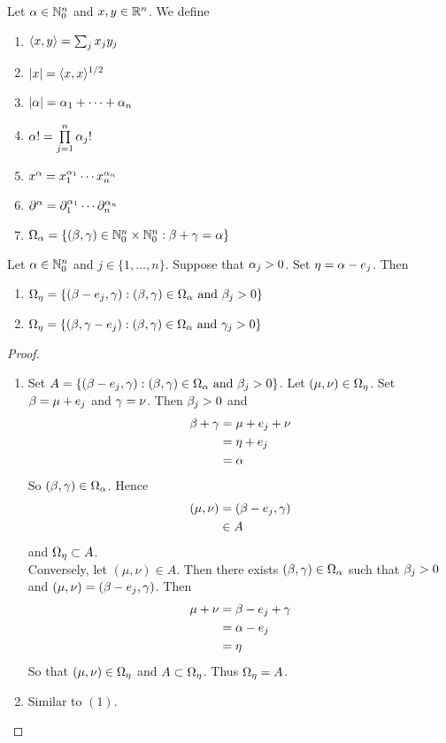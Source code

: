 \documentclass{book}
\begin{document}
	\begin{defn} 
		 Let $\alpha \in \mathbb{N}_0^n$ and $x, y \in \mathbb{R}^n$. We define 
		\begin{enumerate}
			\item $\langle x , y\rangle  = \sum_{j}x_jy_j$
			\item $|x| = \langle x, x\rangle^{1/2}$
			\item $|\alpha| = \alpha_1 + \cdots + \alpha_n$
			\item $\alpha! = \prod\limits_{j=1}^n \alpha_j!$
			\item $x^\alpha = x_1^{\alpha_1}\cdots x_n^{\alpha_n}$
			\item $\partial^{\alpha} = \partial_1^{\alpha_1} \cdots \partial_n^{\alpha_n}$
			\item $\Omega_{\alpha} = \{(\beta, \gamma) \in \mathbb{N}_0^n \times \mathbb{N}_0^n: \beta + \gamma = \alpha\}$
		\end{enumerate}
	\end{defn}

	\begin{ex} 
		Let $\alpha \in \mathbb{N}_0^n$ and $j \in \{1, \ldots, n\}$. Suppose that $\alpha_j > 0$. Set $\eta = \alpha - e_j$. Then 
		\begin{enumerate}
			\item $\Omega_{\eta} = \{(\beta - e_j, \gamma): (\beta, \gamma) \in \Omega_{\alpha} \text{ and } \beta_j > 0\}$
			\item $\Omega_{\eta} = \{(\beta, \gamma - e_j): (\beta, \gamma) \in \Omega_{\alpha} \text{ and } \gamma_j > 0\}$
		\end{enumerate}
	\end{ex}

	\begin{proof}\
		\begin{enumerate}
			\item Set $A = \{(\beta - e_j, \gamma): (\beta, \gamma) \in \Omega_{\alpha} \text{ and } \beta_j > 0\}$. Let $(\mu, \nu) \in \Omega_{\eta}$. Set $\beta = \mu + e_j$ and $\gamma = \nu$. Then $\beta_j > 0$ and 
			\begin{align*}
				\beta + \gamma 
				& = \mu + e_j + \nu \\
				& = \eta + e_j \\
				& = \alpha 
			\end{align*}
			So $(\beta, \gamma) \in \Omega_{\alpha}$. Hence
			\begin{align*}
				(\mu, \nu) 
				& = (\beta - e_j, \gamma) \\
				& \in A
			\end{align*}
			and $\Omega_{\eta} \subset A$. \\
			Conversely, let $(\mu, \nu) \in A$. Then there exists $(\beta, \gamma) \in \Omega_{\alpha}$ such that $\beta_j > 0$ and $(\mu, \nu) = (\beta - e_j, \gamma)$. Then 
			\begin{align*}
				\mu + \nu
				&= \beta - e_j + \gamma \\
				& = \alpha - e_j \\
				& = \eta 
			\end{align*}
			So that $(\mu, \nu) \in \Omega_{\eta}$ and $A \subset \Omega_{\eta}$. Thus $\Omega_{\eta} = A$.
			\item Similar to $(1)$.
		\end{enumerate}
	\end{proof}
\end{document}
